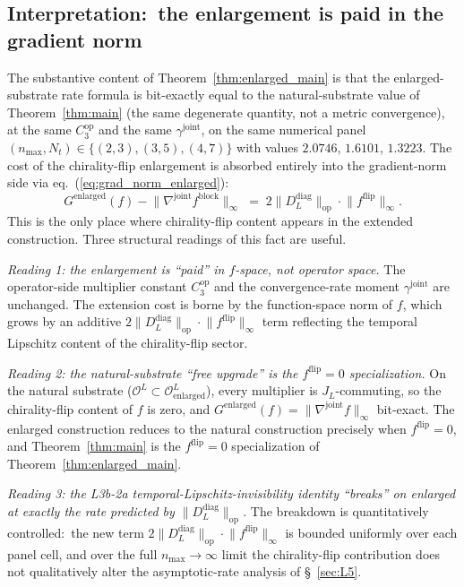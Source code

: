 \documentclass[11pt,a4paper]{article}
\theoremstyle{plain}
\theoremstyle{definition}
\newcommand{\nmax}{n_{\max}}
\newcommand{\Nt}{N_{t}}
\newcommand{\Op}{\mathcal{O}}
\newcommand{\opnorm}[1]{\lVert #1 \rVert_{\mathrm{op}}}
\newcommand{\norm}[1]{\lVert #1 \rVert}
\newcommand{\Ddiag}{D_{L}^{\mathrm{diag}}}
\newcommand{\JL}{J_{L}}
\newcommand{\gammajoint}{\gamma^{\mathrm{joint}}}
\newcommand{\Cthreeop}{C_{3}^{\mathrm{op}}}
\begin{document}
\subsection{Interpretation:\ the enlargement is paid in the gradient norm}
\label{app:enlarged_interpretation}

The substantive content of Theorem~\ref{thm:enlarged_main} is that
the enlarged-substrate rate formula is bit-exactly equal to the
natural-substrate value of Theorem~\ref{thm:main} (the same degenerate
quantity, not a metric convergence), at the same
$\Cthreeop$ and the same $\gammajoint$, on the same numerical panel
$(\nmax, \Nt) \in \{(2, 3), (3, 5), (4, 7)\}$ with values $2.0746$,
$1.6101$, $1.3223$. The cost of the chirality-flip enlargement is
absorbed entirely into the gradient-norm side via
eq.~(\ref{eq:grad_norm_enlarged}):\
\begin{equation*}
   G^{\mathrm{enlarged}}(f) - \norm{\nabla^{\mathrm{joint}} f^{\mathrm{block}}}_{\infty}
   \;=\; 2\opnorm{\Ddiag} \cdot \norm{f^{\mathrm{flip}}}_{\infty}.
\end{equation*}
This is the only place where chirality-flip content appears in the
extended construction. Three structural readings of this fact are
useful.

\emph{Reading 1: the enlargement is ``paid'' in $f$-space, not
operator space.} The operator-side multiplier constant $\Cthreeop$
and the convergence-rate moment $\gammajoint$ are unchanged. The
extension cost is borne by the function-space norm of $f$, which
grows by an additive $2\opnorm{\Ddiag} \cdot \norm{f^{\mathrm{flip}}}_{\infty}$
term reflecting the temporal Lipschitz content of the chirality-flip
sector.

\emph{Reading 2: the natural-substrate ``free upgrade'' is the
$f^{\mathrm{flip}} = 0$ specialization.} On the natural substrate
($\Op^{L} \subset \Op^{L}_{\mathrm{enlarged}}$), every multiplier is
$\JL$-commuting, so the chirality-flip content of $f$ is zero, and
$G^{\mathrm{enlarged}}(f) = \norm{\nabla^{\mathrm{joint}} f}_{\infty}$
bit-exact. The enlarged construction reduces to the natural
construction precisely when $f^{\mathrm{flip}} = 0$, and
Theorem~\ref{thm:main} is the $f^{\mathrm{flip}} = 0$ specialization
of Theorem~\ref{thm:enlarged_main}.

\emph{Reading 3: the L3b-2a temporal-Lipschitz-invisibility identity
``breaks'' on enlarged at exactly the rate predicted by
$\opnorm{\Ddiag}$.} The breakdown is quantitatively controlled:\ the
new term $2\opnorm{\Ddiag} \cdot \norm{f^{\mathrm{flip}}}_{\infty}$
is bounded uniformly over each panel cell, and over the full
$\nmax \to \infty$ limit the chirality-flip contribution does not
qualitatively alter the asymptotic-rate analysis of \S~\ref{sec:L5}.
\end{document}

